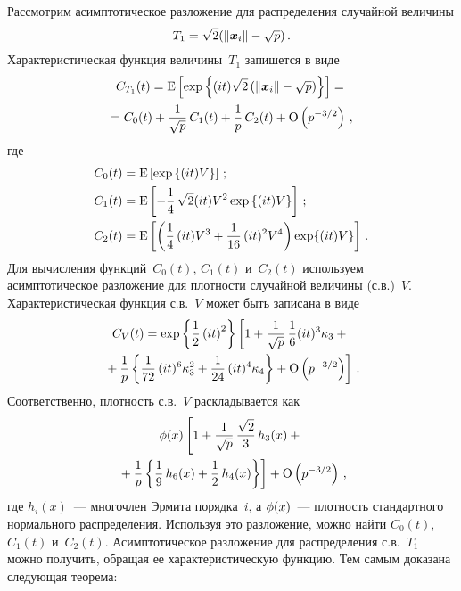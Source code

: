 \begin{multicols}{2}
Рассмотрим асимптотическое разложение для распределения случайной величины
$$
T_1 = \sqrt 2(\|\vx_i\| -\sqrt{p})\,.
$$
Характеристическая функция величины~$T_1$ запишется в виде
\begin{multline*}
C_{T_1}(t) = \E\left[\exp\left\{(it) \sqrt 2 \left(\|\vx_i\| - \sqrt{p}\right)\right\}\right] ={}\\
= C_0(t) + \fr{1}{\sqrt{p}}\,C_1(t)+ \fr{1}{p}\,C_2(t) + \O\left(p^{-3/2}\right)\,,
\end{multline*}
где
\begin{align*}
C_0 (t) &= \E\left[\exp \left \{(it) V \right\}\right]\,; \\
C_1 (t) &= \E\left[- \fr{1}{4}\,\sqrt{2}(it)V^2 \exp \left \{(it) V\right\} \right]\,;\\
C_2 (t) &= \E\left[ \left(\fr{1}{4}\,(it)V^3 + \fr{1}{16}\,(it)^2 V^4 \right) \exp\{(it)V \}\right]\,.
\end{align*}
Для вычисления функций~$C_0(t)$, $C_1(t)$ и~$C_2(t)$ используем асимптотическое разложение для плот\-ности 
случайной величины (с.в.)~$V$.
Характеристическая функция с.в.~$V$ может быть записана в виде
\begin{multline*}
C_V(t) = \exp\left\{\fr{1}{2}\left(it\right)^2\right\}
            \left[1 + \fr{1}{\sqrt{p}}\,\fr{1}{6}(it)^3\kappa_3 +{}\right.\\
\left.{}  + \fr{1}{p}\left\{\fr{1}{72}\,(it)^6\kappa_3^2 + \fr{1}{24}\,(it)^4\kappa_4 \right\} + \O\left(p^{-3/2}\right)\right]\,.
\end{multline*}
Соответственно, плотность с.в.~$V$ раскладывается как
\begin{multline*}
\Ip(x)\left[1 + \fr{1}{\sqrt p}\,\fr{\sqrt{2}}{3}\,h_3(x)
                  + {}\right.\\
\left.                  {}+\fr{1}{p}\left\{\fr{1}{9}\,h_6(x) + \fr{1}{2}\,h_4(x) \right\}\right]+ \O\left(p^{-3/2}\right)\,,
\end{multline*}
где  $h_i(x)$~--- многочлен Эрмита порядка~$i$, а $\Ip(x)$~--- плотность стандартного нормального распределения.
Используя это разложение,   можно  найти $C_0(t)$, $C_1(t)$ и~$C_2(t)$.
Асимптотическое разложение для распределения с.в.~$T_1$ можно получить, обращая ее характеристическую функцию. 
Тем самым доказана следующая теорема:

\medskip


\end{multicols}
